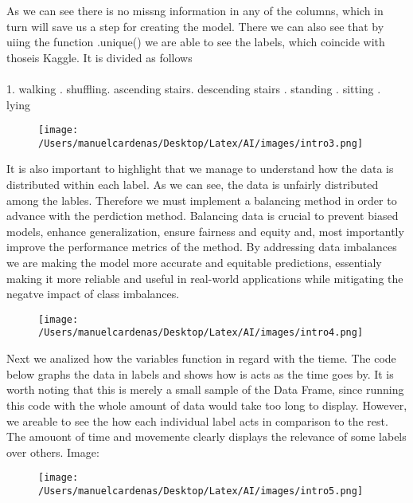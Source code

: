 \documentclass{article}
\begin{document}
    As we can see there is no missng information in any of the columns, which in turn will save us a step for creating the model. 
    There we can also see that by uiing the function .unique() we are able to see the labels, which coincide with thoseis Kaggle. 
    It is divided as follows \\ \\
    1. walking . shuffling. ascending stairs. descending stairs . standing . sitting . lying \pagebreak
    \begin{figure}[h]
        \centering
        \texttt{[image: /Users/manuelcardenas/Desktop/Latex/AI/images/intro3.png]}
        \label{fig:intro3}
    \end{figure}






    It is also important to highlight that we manage to understand how the data is distributed within each label. 
    As we can see, the data is unfairly distributed among the lables. Therefore we must implement a balancing method in order 
    to advance with the perdiction method. Balancing data is crucial to prevent biased models, enhance generalization, ensure 
    fairness and equity and, most importantly improve the performance metrics of the method. By addressing data imbalances we are
    making the model more accurate and equitable predictions, essentialy making it more reliable and useful in real-world applications 
    while mitigating the negatve impact of class imbalances. \pagebreak
    \begin{figure}[h]
        \centering
        \texttt{[image: /Users/manuelcardenas/Desktop/Latex/AI/images/intro4.png]}
        \label{fig:intro4}
    \end{figure}





    Next we analized how the variables function in regard with the tieme. The code below graphs the data in labels 
    and shows how is acts as the time goes by. It is worth noting that this is merely a small sample of the Data Frame, 
    since running this code with the whole amount of data would take too long to display. However, we areable to see the 
    how each individual label acts in comparison to the rest. The amouont of time and movemente clearly displays the 
    relevance of some labels over others. Image:\pagebreak
    \begin{figure}[h]
        \centering
        \texttt{[image: /Users/manuelcardenas/Desktop/Latex/AI/images/intro5.png]}
        \label{fig:intro5}
    \end{figure}
\end{document}
